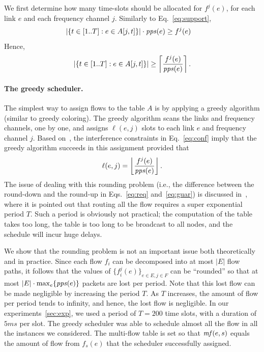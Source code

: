 \documentclass[12pt]{article}
\newenvironment{proof sketch}[1]{\noindent {\emph{Proof sketch of #1:}}}{\hfill \qed}
\newcommand{\pps}{\text{\emph{pps}}}
\newcommand{\mf}{\text{\emph{mf}}}
\begin{document}
We first determine how many time-slots should be allocated for
$f^j(e)$, for each link $e$ and each frequency channel $j$.  Similarly to Eq.~\ref{eq:support},
\begin{align*}
  |\{ t\in[1..T] :e\in A[j,t]\}| \cdot \pps(e) &\geq f^j(e)
\end{align*}
Hence,
\begin{align}\label{eq:req}
  |\{ t\in[1..T] :e\in A[j,t]\}| \geq \left\lceil \frac{f^j(e)}{\pps(e)} \right\rceil.
  \end{align}
\paragraph{The greedy scheduler.}
  The simplest way to assign flows to the table $A$ is by applying a
  greedy algorithm (similar to greedy coloring).  The greedy algorithm scans the links and
  frequency channels, one by one, and assigns $\ell(e,j)$ slots to
  each link $e$ and frequency channel $j$.  Based
  on~\cite{alicherry2005joint11,kumar2004end,buragohain2007improved},
  the interference constraints in Eq.~\ref{eq:conf} imply that the
  greedy algorithm succeeds in this assignment provided that
\begin{align}\label{eq:guar}
 \ell(e,j) = \left\lfloor \frac{f^j(e)}{\pps(e)} \right\rfloor.
  \end{align}
  The issue of dealing with this rounding problem (i.e., the
  difference between the round-down and the round-up in Eqs.~\ref{eq:req} and~\ref{eq:guar}) is discussed
  in~\cite{wan2009multiflows}, where it is pointed out that routing
  all the flow requires a super exponential period $T$. Such a period
  is obviously not practical; the computation of the table takes too
  long, the table is too long to be broadcast to all nodes, and
  the schedule will incur huge delays.

  We show that the rounding problem is not an important issue both
  theoretically and in practice.  Since each flow $f_i$ can be
  decomposed into at most $|E|$ flow paths, it follows that the values
  of $\{f^j_i(e)\}_{e\in E, j\in F}$ can be ``rounded'' so that at
  most $|E|\cdot \max_e \{\pps(e)\}$ packets are lost per period.
  Note that this lost flow can be made negligible by increasing the
  period $T$.  As $T$ increases, the amount of flow per period tends
  to infinity, and hence, the lost flow is negligible. In our
  experiments~\ref{sec:exp}, we used a period of $T=200$ time slots,
  with a duration of $5ms$ per slot. The greedy scheduler was able to
  schedule almost all the flow in all the instances we considered.
  The multi-flow table is set so that $\mf(e,s)$ equals the amount of
  flow from $f_s(e)$ that the scheduler successfully assigned.
\end{document}
